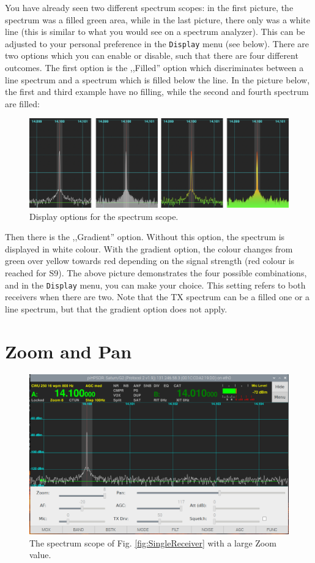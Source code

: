 \documentclass[12pt]{book}
\begin{document}
You have already seen two different spectrum scopes: in the first
picture, the  spectrum was a filled green area, while in the last
picture, there only was a white line (this is similar to what you
would see on a spectrum analyzer). This can be adjusted to your
personal preference in the \texttt{Display} menu (see below). There
are two options which you can enable or disable, such that there
are four different outcomes. The first option is the ,,Filled'' option
which discriminates between a line spectrum and a spectrum which is
filled below the line. In the picture below, the first and third
example have no filling, while the second and fourth spectrum
are filled:

\begin{figure}[h]
\center
\includegraphics[width=12cm]{ScopeFilling.png}
\caption{Display options for the spectrum scope.}
\end{figure}

Then there is the ,,Gradient'' option. Without this option, the
spectrum is displayed in white colour. With the gradient option,
the colour changes from green over yellow towards red depending
on the signal strength (red colour is reached for S9). The above
picture demonstrates the four possible combinations, and in
the \texttt{Display} menu, you can make your choice. This setting
refers to both receivers when there are two. Note that the TX
spectrum can be a filled one or a line spectrum, but that the
gradient option does not apply.

\section{Zoom and Pan}

\begin{figure}[h]
\center
\includegraphics[width=12cm]{ZoomPan.png}
\caption{The spectrum scope of Fig. \ref{fig:SingleReceiver} with a
large Zoom value.}
\end{figure}
\end{document}
